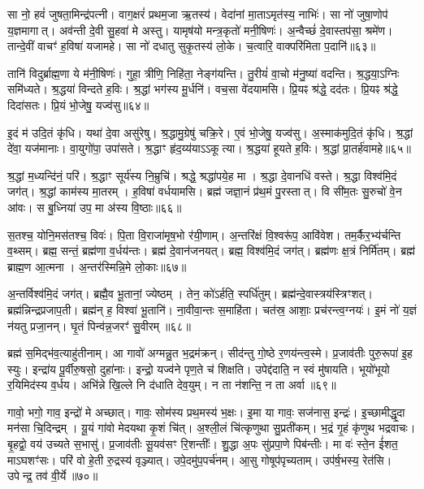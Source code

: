 सा नो॒ हवं॑ जुषता॒मिन्द्र॑पत्नी।
वाग॒क्षरं॑ प्रथम॒जा ऋ॒तस्य॑।
वेदा॑नां मा॒ता\-ऽमृत॑स्य॒ नाभिः॑।
सा नो॑ जुषा॒णोप॑ य॒ज्ञमागात्।
अव॑न्ती दे॒वी सु॒हवा॑ मे अस्तु।
यामृष॑यो मन्त्र॒कृतो॑ मनी॒षिणः॑।
अ॒न्वैच्छं॑ दे॒वास्तप॑सा॒ श्रमे॑ण।
तान्दे॒वीं वाचꣳ॑ ह॒विषा॑ यजामहे।
सा नो॑ दधातु सुकृ॒तस्य॑ लो॒के।
च॒त्वारि॒ वाक्परि॑मिता प॒दानि॑॥६३॥

तानि॑ विदुर्ब्राह्म॒णा ये म॑नी॒षिणः॑।
गुहा॒ त्रीणि॒ निहि॑ता॒ नेङ्ग॑यन्ति।
तु॒रीयं॑ वा॒चो म॑नु॒ष्या॑ वदन्ति।
श्र॒द्धया॒\-ऽग्निः समि॑ध्यते।
श्र॒द्धया॑ विन्दते ह॒विः।
श्र॒द्धां भग॑स्य मू॒र्धनि॑।
वच॒सा वे॑दयामसि।
प्रि॒यꣴ श्र॑द्धे॒ दद॑तः।
प्रि॒यꣴ श्र॑द्धे॒ दिदा॑सतः।
प्रि॒यं भो॒जेषु॒ यज्व॑सु॥६४॥

इ॒दं म॑ उदि॒तं कृ॑धि।
यथा॑ दे॒वा असु॑रेषु।
श्र॒द्धामु॒ग्रेषु॑ चक्रि॒रे।
ए॒वं भो॒जेषु॒ यज्व॑सु।
अ॒स्माक॑मुदि॒तं कृ॑धि।
श्र॒द्धां दे॑वा॒ यज॑मानाः।
वा॒युगो॑पा॒ उपा॑सते।
श्र॒द्धाꣳ हृ॑द॒य्य॑या\-ऽऽकूत्या।
श्र॒द्धया॑ हूयते ह॒विः।
श्र॒द्धां प्रा॒तर्\mbox{}ह॑वामहे॥६५॥

श्र॒द्धां म॒ध्यन्दि॑नं॒ परि॑।
श्र॒द्धाꣳ सूर्य॑स्य नि॒म्रुचि॑।
श्रद्धे॒ श्रद्धा॑पये॒ह मा।
श्र॒द्धा दे॒वानधि॑ वस्ते।
श्र॒द्धा विश्व॑मि॒दं जग॑त्।
श्र॒द्धां काम॑स्य मा॒तरम्।
ह॒विषा॑ वर्धयामसि।
ब्रह्म॑ जज्ञा॒नं प्र॑थ॒मं पु॒रस्तात्।
वि सी॑म॒तः सु॒रुचो॑ वे॒न आ॑वः।
स बु॒ध्निया॑ उप॒ मा अ॑स्य वि॒ष्ठाः॥६६॥

स॒तश्च॒ योनि॒मस॑तश्च॒ विवः॑।
पि॒ता वि॒राजा॑मृष॒भो र॑यी॒णाम्।
अ॒न्तरि॑क्षं वि॒श्वरू॑प॒ आवि॑वेश।
तम॒र्कैर॒भ्य॑र्चन्ति व॒थ्सम्।
ब्रह्म॒ सन्तं॒ ब्रह्म॑णा व॒र्धय॑न्तः।
ब्रह्म॑ दे॒वान॑जनयत्।
ब्रह्म॒ विश्व॑मि॒दं जग॑त्।
ब्रह्म॑णः क्ष॒त्रं निर्मि॑तम्।
ब्रह्म॑ ब्राह्म॒ण आ॒त्मना।
अ॒न्तर॑स्मिन्नि॒मे लो॒काः॥६७॥

अ॒न्तर्विश्व॑मि॒दं जग॑त्।
ब्रह्मै॒व भू॒तानां॒ ज्येष्ठम्।
तेन॒ को॑\-ऽर्\mbox{}हति॒ स्पर्धि॑तुम्।
ब्रह्म॑न्दे॒वास्त्रय॑स्त्रिꣳशत्।
ब्रह्म॑न्निन्द्रप्रजाप॒ती।
ब्रह्म॑न् ह॒ विश्वा॑ भू॒तानि॑।
ना॒वीवा॒न्तः स॒माहि॑ता।
चत॑स्र॒ आशाः॒ प्रच॑रन्त्व॒ग्नयः॑।
इ॒मं नो॑ य॒ज्ञं न॑यतु प्रजा॒नन्।
घृ॒तं पिन्व॑न्न॒जरꣳ॑ सु॒वीरम्॥६८॥

ब्रह्म॑ स॒मिद्भ॑व॒त्याहु॑तीनाम्।
आ गावो॑ अग्मन्नु॒त भ॒द्रम॑क्रन्।
सीद॑न्तु गो॒ष्ठे र॒णय॑न्त्व॒स्मे।
प्र॒जाव॑तीः पुरु॒रूपा॑ इ॒ह स्युः।
इन्द्रा॑य पू॒र्वीरु॒षसो॒ दुहा॑नाः।
इन्द्रो॒ यज्व॑ने पृण॒ते च॑ शिक्षति।
उपेद्द॑दाति॒ न स्वं मु॑षायति।
भूयो॑भूयो र॒यिमिद॑स्य व॒र्धय\sn{}।
अभि॑न्ने खि॒ल्ले नि द॑धाति देव॒युम्।
न ता न॑शन्ति॒ न ता अर्वा॥६९॥

गावो॒ भगो॒ गाव॒ इन्द्रो॑ मे अच्छात्।
गावः॒ सोम॑स्य प्रथ॒मस्य॑ भ॒क्षः।
इ॒मा या गावः॒ सज॑नास॒ इन्द्रः॑।
इ॒च्छामीद्धृ॒दा मन॑सा चि॒दिन्द्रम्।
यू॒यं गा॑वो मेदयथा कृ॒शं चि॑त्।
अ॒श्ली॒लं चि॑त्कृणुथा सु॒प्रती॑कम्।
भ॒द्रं गृ॒हं कृ॑णुथ भद्रवाचः।
बृ॒हद्वो॒ वय॑ उच्यते स॒भासु॑।
प्र॒जाव॑तीः सू॒यव॑सꣳ रि॒शन्तीः᳚।
शु॒द्धा अ॒पः सु॑प्रपा॒णे पिब॑न्तीः।
मा वः॑ स्ते॒न ई॑शत॒ माऽघशꣳ॑सः।
परि॑ वो हे॒ती रु॒द्रस्य॑ वृञ्ज्यात्।
उपे॒दमु॑प॒पर्च॑नम्।
आ॒सु गोषूप॑पृच्यताम्।
उप॑र्\mbox{}ष॒भस्य॒ रेत॑सि।
उपेन्द्र॒ तव॑ वी॒र्ये॥७०॥\anuvakamend[च॒रा॒मि॒ कनी॑यो॒\-ऽन्यानर्पि॑ता प॒दानि॒ यज्व॑सु हवामहे वि॒ष्ठा लो॒काः सु॒वीर॒मर्वा॒ पिब॑न्तीः॒ षट्च॑]


